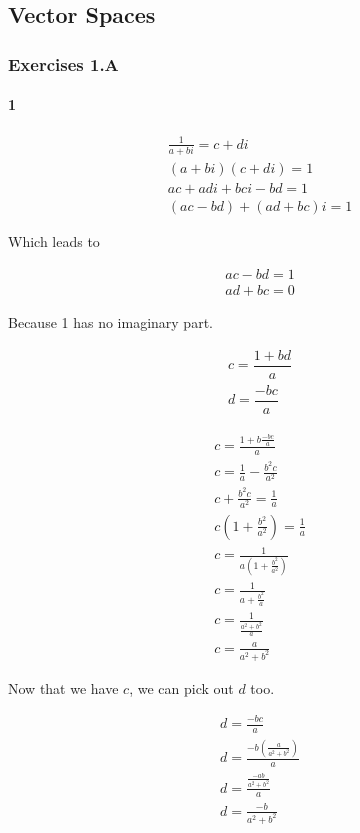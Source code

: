 \subsection{Vector Spaces}

\subsubsection{Exercises 1.A}

\paragraph{1}

\begin{align*}
	\frac{1}{a+bi} = c+di \\
	(a+bi)(c+di) = 1 \\
	ac + adi + bci - bd = 1 \\
	(ac-bd) + (ad+bc)i = 1
\end{align*}

Which leads to

\begin{align*}
	ac-bd = 1 \\
	ad+bc = 0
\end{align*}

Because 1 has no imaginary part.

\begin{align*}
	c = \dfrac{1+bd}{a} \\
	d = \dfrac{-bc}{a}
\end{align*}

\begin{align*}
	c = \frac{1+b\frac{-bc}{a}}{a} \\
	c =\frac{1}{a} - \frac{b^2c}{a^2} \\
	c + \frac{b^2c}{a^2} = \frac{1}{a} \\
	c\left( 1 + \frac{b^2}{a^2} \right) = \frac{1}{a} \\
	c = \frac{1}{a\left( 1 + \frac{b^2}{a^2} \right)} \\
	c = \frac{1}{a + \frac{b^2}{a}} \\
	c = \frac{1}{\frac{a^2+b^2}{a}} \\
	c = \frac{a}{a^2+b^2}
\end{align*}





Now that we have $c$, we can pick out $d$ too.

\begin{align*}
	d = \frac{-bc}{a} \\
	d = \frac{-b\left( \frac{a}{a^2+b^2} \right)}{a} \\
	d = \frac{\frac{-ab}{a^2+b^2}}{a} \\
	d = \frac{-b}{a^2+b^2}
\end{align*}


